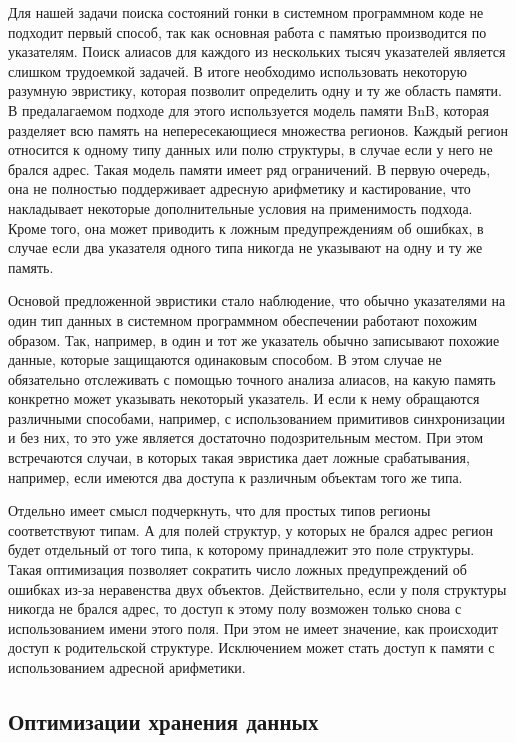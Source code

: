 Для нашей задачи поиска состояний гонки в системном программном коде не подходит первый способ, так как основная работа с памятью производится по указателям.
Поиск алиасов для каждого из нескольких тысяч указателей является слишком трудоемкой задачей.
В итоге необходимо использовать некоторую разумную эвристику, которая позволит определить одну и ту же область памяти. 
В предалагаемом подходе для этого используется модель памяти BnB, которая разделяет всю память на непересекающиеся множества регионов.
Каждый регион относится к одному типу данных или полю структуры, в случае если у него не брался адрес.
Такая модель памяти имеет ряд ограничений. В первую очередь, она не полностью поддерживает адресную арифметику и кастирование, что накладывает некоторые дополнительные условия на применимость подхода.
Кроме того, она может приводить к ложным предупреждениям об ошибках, в случае если два указателя одного типа никогда не указывают на одну и ту же память.

Основой предложенной эвристики стало наблюдение, что обычно указателями на один тип данных в системном программном обеспечении работают похожим образом.
Так, например, в один и тот же указатель обычно записывают похожие данные, которые защищаются одинаковым способом.
В этом случае не обязательно отслеживать с помощью точного анализа алиасов, на какую память конкретно может указывать некоторый указатель.
И если к нему обращаются различными способами, например, с использованием примитивов синхронизации и без них, то это уже является достаточно подозрительным местом.
При этом встречаются случаи, в которых такая эвристика дает ложные срабатывания, например, если имеются два доступа к различным объектам того же типа.

Отдельно имеет смысл подчеркнуть, что для простых типов регионы соответствуют типам.
А для полей структур, у которых не брался адрес регион будет отдельный от того типа, к которому принадлежит это поле структуры.
Такая оптимизация позволяет сократить число ложных предупреждений об ошибках из-за неравенства двух объектов.
Действительно, если у поля структуры никогда не брался адрес, то доступ к этому полу возможен только снова с использованием имени этого поля.
При этом не имеет значение, как происходит доступ к родительской структуре.
Исключением может стать доступ к памяти с использованием адресной арифметики.


\subsection{Оптимизации хранения данных}
\label{subsect_impl_storage}

